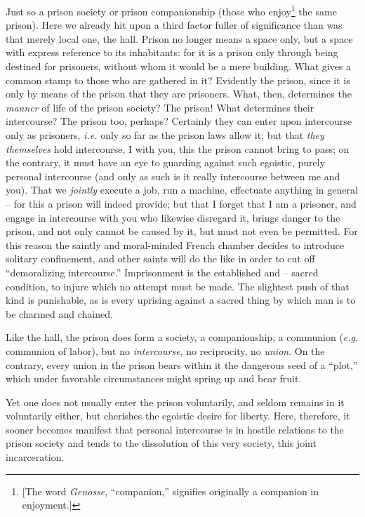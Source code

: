 \documentclass[12pt,a4paper]{book}
\begin{document}
Just so a prison society or prison companionship (those who 
enjoy\footnote{[The word \textit{Genosse}, ``companion,'' signifies 
originally a companion in enjoyment.]} the same prison). Here we already hit 
upon a third factor fuller of significance than was that merely local one, the 
hall. Prison no longer means a space only, but a space with express reference 
to its inhabitants: for it is a prison only through being destined for 
prisoners, without whom it would be a mere building. What gives a common stamp 
to those who are gathered in it? Evidently the prison, since it is only by 
means of the prison that they are prisoners. What, then, determines the 
\textit{manner} of life of the prison society? The prison! What determines 
their intercourse? The prison too, perhaps? Certainly they can enter upon 
intercourse only as prisoners, \textit{i.e.} only so far as the prison laws 
allow it; but that \textit{they themselves} hold intercourse, I with you, this 
the prison cannot bring to pass; on the contrary, it must have an eye to 
guarding against such egoistic, purely personal intercourse (and only as such 
is it really intercourse between me and you). That we \textit{jointly} execute 
a job, run a machine, effectuate anything in general -- for this a prison will 
indeed provide; but that I forget that I am a prisoner, and engage in 
intercourse with you who likewise disregard it, brings danger to the prison, 
and not only cannot be caused by it, but must not even be permitted. For this 
reason the saintly and moral-minded French chamber decides to introduce 
solitary confinement, and other saints will do the like in order to cut off 
``demoralizing intercourse.'' Imprisonment is the established and -- sacred 
condition, to injure which no attempt must be made. The slightest push of that 
kind is punishable, as is every uprising against a sacred thing by which man 
is to be charmed and chained.

Like the hall, the prison does form a society, a companionship, a communion 
(\textit{e.g.} communion of labor), but no \textit{intercourse}, no 
reciprocity, no \textit{union}. On the contrary, every union in the prison 
bears within it the dangerous seed of a ``plot,'' which under favorable 
circumstances might spring up and bear fruit.

Yet one does not usually enter the prison voluntarily, and seldom remains in 
it voluntarily either, but cherishes the egoistic desire for liberty. Here, 
therefore, it sooner becomes manifest that personal intercourse is in hostile 
relations to the prison society and tends to the dissolution of this very 
society, this joint incarceration.
\end{document}
